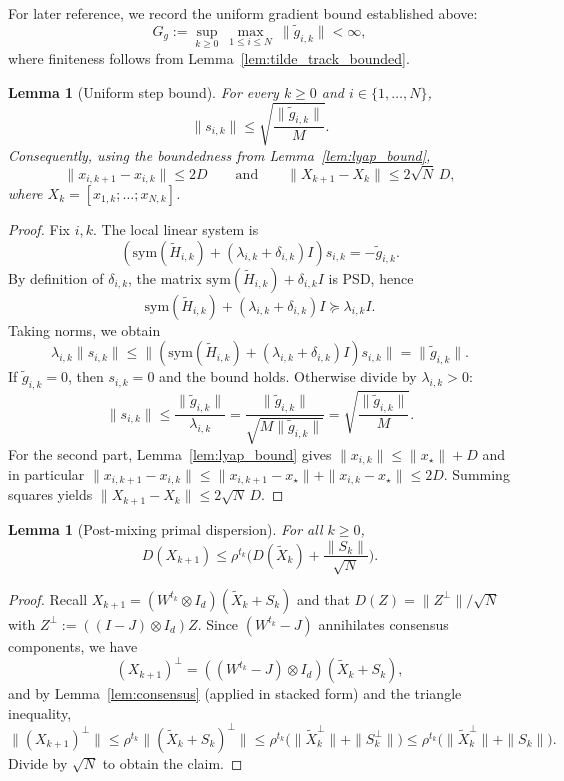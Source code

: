 \documentclass[10pt,twocolumn,letterpaper]{article}
\def\one{1}%
\def\J{J}%
\theoremstyle{compact}
\newtheorem{lemma}[theorem]{Lemma}
\theoremstyle{compactremark}
\newcommand{\one}{\mathbf{1}}
\newcommand{\J}{\left(\frac{1}{N}\one\one^\top\right)}
\begin{document}
For later reference, we record the uniform gradient bound established above:
\begin{equation}\label{eq:step_unif_app}
G_g:=\sup_{k\ge 0}\ \max_{1\le i\le N}\ \|\tilde g_{i,k}\| < \infty,
\end{equation}
where finiteness follows from Lemma~\ref{lem:tilde_track_bounded}.


\begin{lemma}[Uniform step bound]\label{lem:step_bound_app}
For every $k\ge0$ and $i\in\{1,\dots,N\}$,
\[
\|s_{i,k}\|\le \sqrt{\frac{\|\tilde g_{i,k}\|}{M}}.
\]
Consequently, using the boundedness from Lemma~\ref{lem:lyap_bound},
\[
\|x_{i,k+1}-x_{i,k}\|\le 2D
\qquad\text{and}\qquad
\|X_{k+1}-X_k\|\le 2\sqrt N\,D,
\]
where $X_k=[x_{1,k};\dots;x_{N,k}]$.
\end{lemma}
\begin{proof}
Fix $i,k$. The local linear system is
\[
(\mathrm{sym}(\tilde H_{i,k})+(\lambda_{i,k}+\delta_{i,k})I)s_{i,k}=-\tilde g_{i,k}.
\]
By definition of $\delta_{i,k}$, the matrix $\mathrm{sym}(\tilde H_{i,k})+\delta_{i,k}I$ is PSD, hence
\[
\mathrm{sym}(\tilde H_{i,k})+(\lambda_{i,k}+\delta_{i,k})I \succeq \lambda_{i,k}I.
\]
Taking norms, we obtain
\[
\lambda_{i,k}\|s_{i,k}\|\le \|(\mathrm{sym}(\tilde H_{i,k})+(\lambda_{i,k}+\delta_{i,k})I)s_{i,k}\|=\|\tilde g_{i,k}\|.
\]
If $\tilde g_{i,k}=0$, then $s_{i,k}=0$ and the bound holds. Otherwise divide by $\lambda_{i,k}>0$:
\[
\|s_{i,k}\|\le \frac{\|\tilde g_{i,k}\|}{\lambda_{i,k}}
=\frac{\|\tilde g_{i,k}\|}{\sqrt{M\|\tilde g_{i,k}\|}}
=\sqrt{\frac{\|\tilde g_{i,k}\|}{M}}.
\]
For the second part, Lemma~\ref{lem:lyap_bound} gives $\|x_{i,k}\|\le \|x_\star\|+D$ and in particular
$\|x_{i,k+1}-x_{i,k}\|\le \|x_{i,k+1}-x_\star\|+\|x_{i,k}-x_\star\|\le 2D$.
Summing squares yields $\|X_{k+1}-X_k\|\le 2\sqrt N\,D$.
\end{proof}

\begin{lemma}[Post-mixing primal dispersion]\label{lem:DX_post}
For all $k\ge 0$,
\[
D(X_{k+1})\le \rho^{t_k}\Big(D(\tilde X_k)+\frac{\|S_k\|}{\sqrt N}\Big).
\]
\end{lemma}
\begin{proof}
Recall $X_{k+1}=(W^{t_k}\otimes I_d)(\tilde X_k+S_k)$ and that $D(Z)=\|Z^\perp\|/\sqrt N$ with $Z^\perp:=((I-\J)\otimes I_d)Z$.
Since $(W^{t_k}-\J)$ annihilates consensus components, we have
\[
(X_{k+1})^\perp = ((W^{t_k}-\J)\otimes I_d)(\tilde X_k+S_k),
\]
and by Lemma~\ref{lem:consensus} (applied in stacked form) and the triangle inequality,
\[
\| (X_{k+1})^\perp\|
\le \rho^{t_k}\|(\tilde X_k+S_k)^\perp\|
\le \rho^{t_k}\big(\|\tilde X_k^\perp\|+\|S_k^\perp\|\big)
\le \rho^{t_k}\big(\|\tilde X_k^\perp\|+\|S_k\|\big).
\]
Divide by $\sqrt N$ to obtain the claim.
\end{proof}
\end{document}
